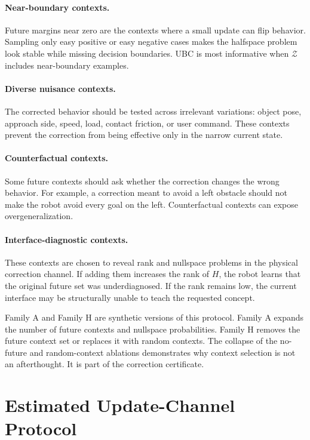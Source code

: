 \documentclass{article}
\begin{document}
\paragraph{Near-boundary contexts.}
Future margins near zero are the contexts where a small update can flip behavior.
Sampling only easy positive or easy negative cases makes the halfspace problem
look stable while missing decision boundaries. UBC is most informative when
$\mathcal{Z}$ includes near-boundary examples.

\paragraph{Diverse nuisance contexts.}
The corrected behavior should be tested across irrelevant variations: object
pose, approach side, speed, load, contact friction, or user command. These
contexts prevent the correction from being effective only in the narrow current
state.

\paragraph{Counterfactual contexts.}
Some future contexts should ask whether the correction changes the wrong
behavior. For example, a correction meant to avoid a left obstacle should not
make the robot avoid every goal on the left. Counterfactual contexts can expose
overgeneralization.

\paragraph{Interface-diagnostic contexts.}
These contexts are chosen to reveal rank and nullspace problems in the physical
correction channel. If adding them increases the rank of $H$, the robot learns
that the original future set was underdiagnosed. If the rank remains low, the
current interface may be structurally unable to teach the requested concept.

Family A and Family H are synthetic versions of this protocol. Family A expands
the number of future contexts and nullspace probabilities. Family H removes the
future context set or replaces it with random contexts. The collapse of the
no-future and random-context ablations demonstrates why context selection is not
an afterthought. It is part of the correction certificate.

\section{Estimated Update-Channel Protocol}
\end{document}
